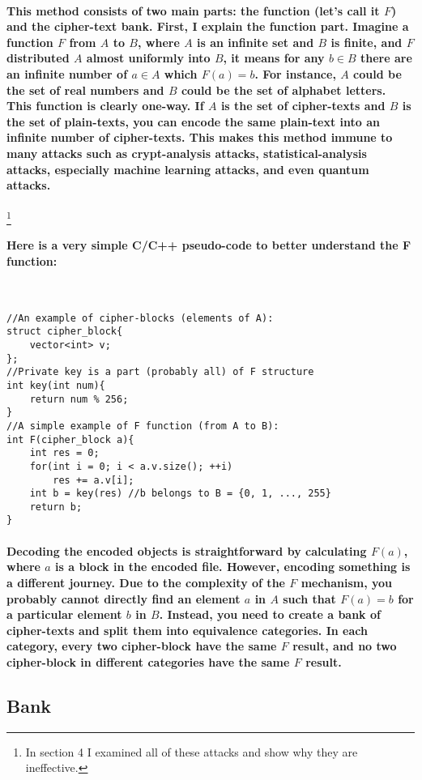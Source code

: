 \documentclass[oneside]{book}
\newcommand{\myparagraph}[1]{\paragraph{\textnormal{#1}}}
\begin{document}
\myparagraph{
This method consists of two main parts: the function (let's call it $F$) and the cipher-text bank. First, I explain the function part. Imagine a function $F$ from $A$ to $B$, where $A$ is an infinite set and $B$ is finite, and $F$ distributed $A$ almost uniformly into $B$, it means for any $b \in B$ there are an infinite number of $a \in A$ which $F(a) = b$. For instance, $A$ could be the set of real numbers and $B$ could be the set of alphabet letters. This function is clearly one-way. If $A$ is the set of cipher-texts and $B$ is the set of plain-texts, you can encode the same plain-text into an infinite number of cipher-texts. This makes this method immune to many attacks such as crypt-analysis attacks, statistical-analysis attacks, especially machine learning attacks, and even quantum attacks.
}
\footnote{In section 4 I examined all of these attacks and show why they are ineffective.}

\myparagraph{
Here is a very simple C/C++ pseudo-code to better understand the F function:
}

\,

\begin{lstlisting}
//An example of cipher-blocks (elements of A):
struct cipher_block{
    vector<int> v;
};
//Private key is a part (probably all) of F structure
int key(int num){
    return num % 256;
}
//A simple example of F function (from A to B):
int F(cipher_block a){
    int res = 0;
    for(int i = 0; i < a.v.size(); ++i)
        res += a.v[i];
    int b = key(res) //b belongs to B = {0, 1, ..., 255}
    return b;
}
\end{lstlisting}

\myparagraph{
Decoding the encoded objects is straightforward by calculating $F(a)$, where $a$ is a block in the encoded file. However, encoding something is a different journey. Due to the complexity of the $F$ mechanism, you probably cannot directly find an element $a$ in $A$ such that $F(a) = b$ for a particular element $b$ in $B$. Instead, you need to create a bank of cipher-texts and split them into equivalence categories. In each category, every two cipher-block have the same $F$ result, and no two cipher-block in different categories have the same $F$ result.
}

\subsection{Bank}
\end{document}
